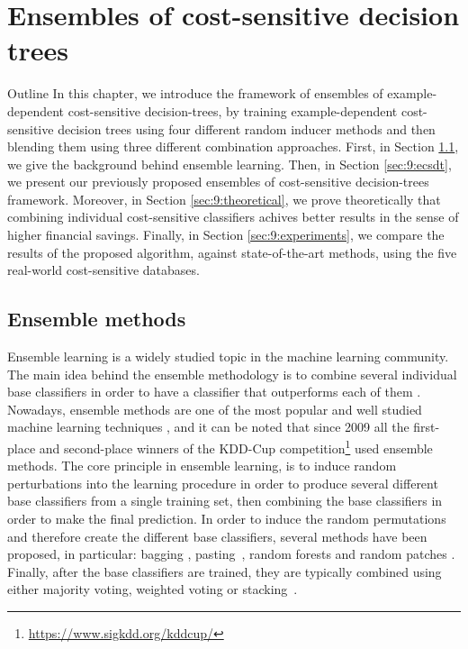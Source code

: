 \chapter{Ensembles of cost-sensitive decision trees}\label{ch:9}

\begin{remark}{Outline}
In this chapter, we introduce the framework of ensembles of example-dependent cost-sensitive 
decision-trees, by training example-dependent cost-sensitive decision trees using four different 
random inducer methods and then blending them using three different combination approaches.
First, in Section \ref{sec:9:ensemble}, we give the background behind ensemble learning. Then, in 
Section \ref{sec:9:ecsdt}, we present our previously proposed ensembles of cost-sensitive 
decision-trees framework. Moreover, in Section \ref{sec:9:theoretical}, we prove theoretically that 
combining individual cost-sensitive classifiers achives better  results in the sense of higher 
financial savings. Finally, in Section \ref{sec:9:experiments}, we compare the results of the 
proposed algorithm, against state-of-the-art methods, using the five real-world cost-sensitive 
databases.
\end{remark}


\section{Ensemble methods}
\label{sec:9:ensemble}

Ensemble learning is a widely studied topic in the machine learning community. The main idea behind 
the ensemble methodology is to combine several individual base classifiers in   order to have a 
classifier that outperforms each of them \citep{Rokach2009}. Nowadays,   ensemble methods are  one 
of the most popular and well studied machine learning techniques   \citep{Zhou2012}, and it can be 
noted that since 2009 all the first-place and   second-place winners of the KDD-Cup 
competition\footnote{\url{https://www.sigkdd.org/kddcup/}}   used  ensemble methods. The core 
principle in ensemble learning, is to induce random perturbations into  the learning procedure in 
order to produce several different base classifiers from a single  training set, then combining the 
base classifiers in order to make the final prediction.  In order to induce the random permutations 
and therefore create the different base classifiers,   several methods have been proposed, in 
particular: bagging \citep{Breiman1996},   pasting~\citep{Breiman1999}, random forests 
\citep{Breiman2001} and random patches   \citep{Louppe2012}. Finally, after  the base   classifiers 
are trained, they are typically   combined using either   majority voting,  weighted  voting    or  
stacking~\citep{Zhou2012}.

